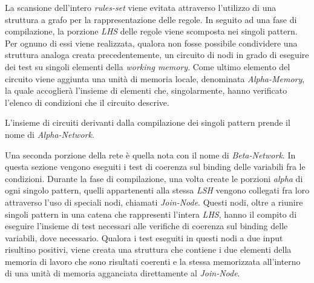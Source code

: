 La scansione dell'intero \emph{rules-set} viene evitata attraverso l'utilizzo di una struttura a grafo per la rappresentazione delle regole. In seguito ad una fase di compilazione, la porzione \emph{LHS} delle regole viene scomposta nei singoli pattern. Per ognuno di essi viene realizzata, qualora non fosse possibile condividere una struttura analoga creata precedentemente, un circuito di nodi in grado di eseguire dei test su singoli elementi della \emph{working memory}. Come ultimo elemento del circuito viene aggiunta una unità di memoria locale, denominata \emph{Alpha-Memory}, la quale accoglierà l'insieme di elementi che, singolarmente, hanno verificato l'elenco di condizioni che il circuito descrive.~\cite{Doorenbos95productionmatching}

L'insieme di circuiti derivanti dalla compilazione dei singoli pattern prende il nome di \emph{Alpha-Network}.

Una seconda porzione della rete è quella nota con il nome di \emph{Beta-Network}. In questa sezione vengono eseguiti i test di coerenza sul binding delle variabili fra le condizioni. Durante la fase di compilazione, una volta create le porzioni \emph{alpha} di ogni singolo pattern, quelli appartenenti alla stessa \emph{LSH} vengono collegati fra loro attraverso l'uso di speciali nodi, chiamati \emph{Join-Node}. Questi nodi, oltre a riunire singoli pattern in una catena che rappresenti l'intera \emph{LHS}, hanno il compito di eseguire l'insieme di test necessari alle verifiche di coerenza sul binding delle variabili, dove necessario. Qualora i test eseguiti in questi nodi a due input risultino positivi, viene creata una struttura che contiene i due elementi della memoria di lavoro che sono risultati coerenti e la stessa memorizzata all'interno di una unità di memoria agganciata direttamente al \emph{Join-Node}. 

